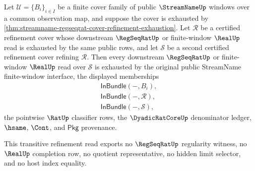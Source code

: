 \begin{theorem}
\label{thm:streamname-regseqrat-cover-refinement-transitivity}
Let $\mathcal{U}=\{B_i\}_{i\in I}$ be a finite cover family of public
$\StreamNameUp$ windows over a common observation map, and suppose the cover is
exhausted by
\autoref{thm:streamname-regseqrat-cover-refinement-exhaustion}. Let
$\mathcal{R}$ be a certified refinement cover whose downstream
$\RegSeqRatUp$ or finite-window $\RealUp$ read is exhausted by the same public
rows, and let $\mathcal{S}$ be a second certified refinement cover refining
$\mathcal{R}$. Then every downstream $\RegSeqRatUp$ or finite-window
$\RealUp$ read over $\mathcal{S}$ is exhausted by the original public
StreamName finite-window interface, the displayed memberships
$$
\begin{gathered}
\mathsf{InBundle}(-,B_i),\\
\mathsf{InBundle}(-,\mathcal{R}),\\
\mathsf{InBundle}(-,\mathcal{S}),
\end{gathered}
$$
the pointwise $\RatUp$ classifier rows, the $\DyadicRatCoreUp$ denominator
ledger, $\hsame$, $\Cont$, and $\mathsf{Pkg}$ provenance.

This transitive refinement read exports no $\RegSeqRatUp$ regularity witness,
no $\RealUp$ completion row, no quotient representative, no hidden limit
selector, and no host index equality.
\end{theorem}
